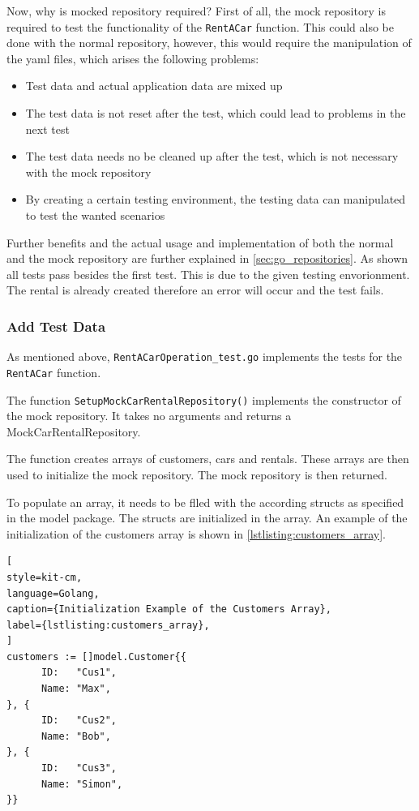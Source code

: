 Now, why is mocked repository required?
First of all, the mock repository is required to test the functionality of the \texttt{RentACar} function.
This could also be done with the normal repository, however, this would require the manipulation of the yaml files, which arises the following problems:
\begin{itemize}
      \item Test data and actual application data are mixed up
      \item The test data is not reset after the test, which could lead to problems in the next test
      \item The test data needs no be cleaned up after the test, which is not necessary with the mock repository
      \item By creating a certain testing environment, the testing data can manipulated to test the wanted scenarios
\end{itemize}

Further benefits and the actual usage and implementation of both the normal and the mock repository are further explained in \autoref{sec:go_repositories}.
As shown all tests pass besides the first test.
This is due to the given testing envorionment.
The rental is already created therefore an error will occur and the test fails.

\subsubsection*{Add Test Data}
As mentioned above, \texttt{RentACarOperation\_test.go} implements the tests for the \texttt{RentACar} function.

The function \texttt{SetupMockCarRentalRepository()} implements the constructor of the mock repository.
It takes no arguments and returns a MockCarRentalRepository.

The function creates arrays of customers, cars and rentals.
These arrays are then used to initialize the mock repository.
The mock repository is then returned.

To populate an array, it needs to be flled with the according structs as specified in the model package.
The structs are initialized in the array.
An example of the initialization of the customers array is shown in \autoref{lstlisting:customers_array}.

\begin{lstlisting}[
style=kit-cm,
language=Golang,
caption={Initialization Example of the Customers Array},
label={lstlisting:customers_array},
]
customers := []model.Customer{{
      ID:   "Cus1",
      Name: "Max",
}, {
      ID:   "Cus2",
      Name: "Bob",
}, {
      ID:   "Cus3",
      Name: "Simon",
}}
\end{lstlisting}

